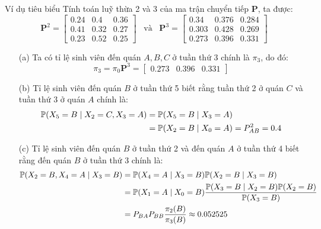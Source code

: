 \begin{frame}{Ví dụ tiêu biểu}
\noindent Tính toán luỹ thừa 2 và 3 của ma trận chuyển tiếp $\mathbf{P}$, ta được:
$$
\mathbf{P}^2 = \begin{bmatrix}
    0.24 & 0.4 & 0.36 \\
    0.41 & 0.32 & 0.27 \\
    0.23 & 0.52 & 0.25
\end{bmatrix} \hspace{10pt} \text{và} \hspace{10pt}
\mathbf{P}^3 = \begin{bmatrix}
    0.34 & 0.376 & 0.284 \\
    0.303 & 0.428 & 0.269 \\
    0.273 & 0.396 & 0.331 
\end{bmatrix}
$$

\begin{itemize}
    \item[(a)] Ta có tỉ lệ sinh viên đến quán $A, B, C$ ở tuần thứ 3 chính là $\pi_3$, do đó:
    $$
    \pi_3 = \pi_0 \mathbf{P}^3 = \begin{bmatrix}
        0.273 & 0.396 & 0.331
    \end{bmatrix}
    $$

    \item[(b)] Tỉ lệ sinh viên đến quán $B$ ở tuần thứ 5 biết rằng tuần thứ 2 ở quán $C$ và tuần thứ $3$ ở quán $A$ chính là:
    $$
    \begin{aligned}
    \P(X_5 = B \mid X_2 = C, X_3 = A) &= \P(X_5 = B \mid X_3 = A) \\
    &= \P(X_2 = B \mid X_0 = A) = P^2_{AB} = 0.4
    \end{aligned}
    $$

    \item[(c)] Tỉ lệ sinh viên đến quán $B$ ở tuần thứ 2 và đến quán $A$ ở tuần thứ 4 biết rằng đến quán $B$ ở tuần thứ 3 chính là:
    $$
    \begin{aligned}
    \P(X_2 = B, X_4 = A \mid X_3 = B) &= \P(X_4 = A \mid X_3 = B) \P(X_2 = B \mid X_3 = B) \\
    &= \P(X_1 = A \mid X_0 = B) \dfrac{\P(X_3 = B \mid X_2 = B) \P(X_2 = B)}{\P(X_3 = B)} \\
    &= P_{BA}P_{BB} \dfrac{\pi_2(B)}{\pi_3(B)} \approx 0.052525 
    \end{aligned}
    $$
\end{itemize}
\end{frame}
